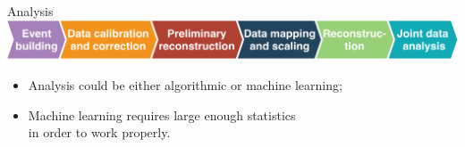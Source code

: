 \documentclass[18pt]{beamer}
\newcommand{\insimg}[1]{
\begin{tikzpicture}[remember picture,overlay]
  \node[xshift=-7.7ex,yshift=12ex] at (current page.south east){%
    \texttt{[image: pics/\#1]}
  };
\end{tikzpicture}
}
\begin{document}
\begin{frame}{Analysis}
    \includegraphics[width=1\textwidth]{pics/an_steps.pdf}
    \vspace{2em}
    \begin{itemize}
        \item Analysis could be either algorithmic or machine learning;
        \item Machine learning requires large enough statistics\\in order to work properly.
    \end{itemize}
\end{frame}


\end{document}

